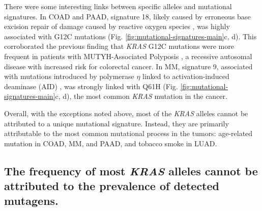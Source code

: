 \documentclass[english, 12pt, letterpaper]{article}
\newcommand{\KRAS}{\emph{KRAS}}
\begin{document}
There were some interesting links between specific alleles and mutational signatures.
In COAD and PAAD, signature 18, likely caused by erroneous base excision repair of damage caused by reactive oxygen species \cite{Viel2017, Pilati2017}, was highly associated with G12C mutations (Fig. \ref{fig:mutational-signatures-main}c, d). 
This corroborated the previous finding that \KRAS{} G12C mutations were more frequent in patients with MUTYH-Associated Polyposis \cite{Viel2017}, a recessive autosomal disease with increased risk for colorectal cancer. 
In MM, signature 9, associated with mutations introduced by polymerase $\eta$ linked to activation-induced deaminase (AID) \cite{Pavri2010Activation-inducedSpt5.}, was strongly linked with Q61H (Fig. \ref{fig:mutational-signatures-main}c, d), the most common \KRAS{} mutation in the cancer.

Overall, with the exceptions noted above, most of the \KRAS{} alleles cannot be attributed to a unique mutational signature. 
Instead, they are primarily attributable to the most common mutational process in the tumors: age-related mutation in COAD, MM, and PAAD, and tobacco smoke in LUAD.


\subsection*{The frequency of most \KRAS{} alleles cannot be attributed to the prevalence of detected mutagens.}
\end{document}
